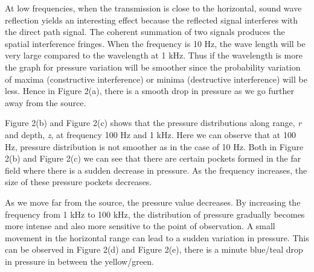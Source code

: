 \noindent At low frequencies, when the transmission is close to the horizontal,  sound wave reflection yields an interesting effect because the reflected signal interferes with the direct path signal. The coherent summation of two signals produces the spatial interference fringes. When the frequency is 10 Hz, the wave length will be very large compared to the wavelength at 1 kHz. Thus if the wavelength is more the graph for pressure variation will be smoother since the probability variation of maxima (constructive interference) or minima (destructive interference) will be less. Hence in Figure 2(a), there is a smooth drop in pressure as we go further away from the source. 

\noindent Figure 2(b) and Figure 2(c) shows that the pressure distributions along range, \textit{r} and depth, \textit{z}, at frequency 100 Hz and 1 kHz. Here we can observe that at 100 Hz, pressure distribution is not smoother as in the case of 10 Hz. Both in Figure 2(b) and Figure 2(c) we can see that there are certain pockets formed in the far field where there is a sudden decrease in pressure. As the frequency increases, the size of these pressure pockets decreases.

\noindent As we move far from the source, the pressure value decreases. By increasing the frequency from 1 kHz to 100 kHz, the distribution of pressure gradually becomes more intense and also more sensitive to the point of observation. A small movement in the horizontal range can lead to a sudden variation in pressure. This can be observed in Figure 2(d) and Figure 2(e), there is a minute blue/teal drop in pressure in between the yellow/green.

